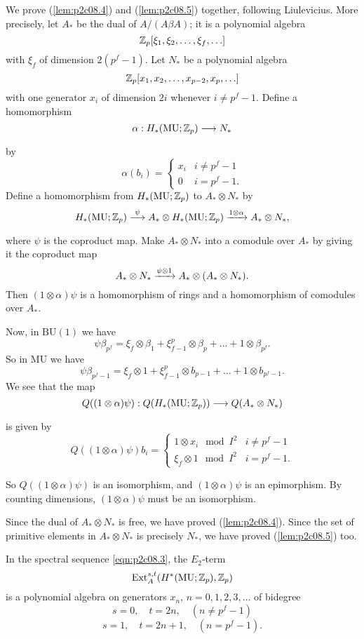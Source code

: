 \documentclass[../main]{subfiles}
\begin{document}
We prove (\ref{lem:p2c08.4}) and (\ref{lem:p2c08.5}) together, following Liulevicius. More precisely, let $A_\ast$ be the dual of $A/(A \beta A)$; it is a polynomial algebra \[\mathbb{Z}_p[\xi_1, \xi_2, \ldots, \xi_f, \ldots]\] with $\xi_f$ of dimension $2(p^f - 1)$. Let $N_\ast$ be a polynomial algebra \[\mathbb{Z}_p[x_1, x_2, \ldots, x_{p - 2}, x_p, \ldots]\] with one generator $x_i$ of dimension $2i$ whenever $i \ne p^f - 1$. Define a homomorphism \[\alpha : H_\ast(\mathrm{MU}; \bbZ_p) \lar{} N_\ast\] by \[\alpha(b_i) = \begin{cases}x_i & i \ne p^f - 1 \\ 0 & i = p^f - 1.\end{cases}\] Define a homomorphism from $H_\ast(\mathrm{MU}; \mathbb{Z}_p)$ to $A_\ast \otimes N_\ast$ by \[H_\ast(\mathrm{MU}; \bbZ_p) \lar{\psi} A_\ast \otimes H_\ast(\mathrm{MU}; \bbZ_p) \lar{1 \otimes \alpha} A_\ast \otimes N_\ast,\] where $\psi$ is the coproduct map. Make $A_\ast \otimes N_\ast$ into a comodule over $A_\ast$ by giving it the coproduct map \[A_\ast \otimes N_\ast \lar{\psi \otimes 1} A_\ast \otimes (A_\ast \otimes N_\ast).\] Then $(1 \otimes \alpha) \psi$ is a homomorphism of rings and a homomorphism of comodules over $A_\ast$.

Now, in $\mathrm{BU}(1)$ we have \[\psi \beta_{p^f} = \xi_f \otimes \beta_1 + \xi_{f-1}^p \otimes \beta_p + \ldots + 1 \otimes \beta_{p^f}.\] So in $\mathrm{MU}$ we have \[\psi \beta_{p^f - 1} = \xi_f \otimes 1 + \xi_{f - 1}^p \otimes b_{p - 1} + \ldots + 1 \otimes b_{p^f - 1}.\] We see that the map \[Q((1 \otimes \alpha) \psi) : Q(H_\ast(\mathrm{MU}; \bbZ_p)) \lar{} Q(A_\ast \otimes N_\ast)\] is given by \[Q((1 \otimes \alpha) \psi) b_i = \begin{cases}1 \otimes x_i \mod I^2 & i \ne p^f - 1 \\ \xi_f \otimes 1 \mod I^2 & i = p^f - 1.\end{cases}\]

So $Q((1 \otimes \alpha)\psi)$ is an isomorphism, and $(1 \otimes \alpha) \psi$ is an epimorphism. By counting dimensions, $(1 \otimes \alpha) \psi$ must be an isomorphism. 

Since the dual of $A_\ast \otimes N_\ast$ is free, we have proved (\ref{lem:p2c08.4}). Since the set of primitive elements in $A_\ast \otimes N_\ast$ is precisely $N_\ast$, we have proved (\ref{lem:p2c08.5}) too.

\begin{corollary}
\label{cor:p2c08.6}
In the spectral sequence \eqref{eqn:p2c08.3}, the $E_2$-term \[\mathrm{Ext}_A^{s, t} (H^\ast(\mathrm{MU}; \mathbb{Z}_p), \mathbb{Z}_p)\] is a polynomial algebra on generators $x_n$, $n = 0, 1, 2, 3, \ldots$ of bidegree 
\[s = 0, \quad t = 2n, \quad (n \ne p^f - 1)\]
\[s = 1, \quad t = 2n + 1, \quad (n = p^f - 1).\]
\end{corollary}
\end{document}
